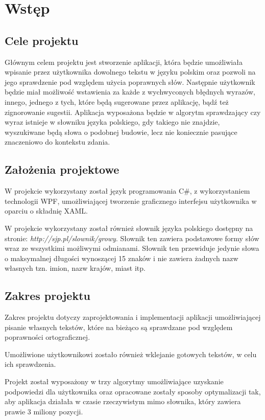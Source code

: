 \chapter{Wstęp}

\section{Cele projektu}

Głównym celem projektu jest stworzenie aplikacji, która będzie umożliwiała wpisanie przez użytkownika dowolnego tekstu w języku polskim oraz pozwoli na jego sprawdzenie pod względem użycia poprawnych słów. Następnie użytkownik będzie miał możliwość wstawienia za każde z wychwyconych błędnych wyrazów, innego, jednego z tych, które będą sugerowane przez aplikację, bądź też zignorowanie sugestii. Aplikacja wyposażona będzie w algorytm sprawdzający czy wyraz istnieje w słowniku języka polskiego, gdy takiego nie znajdzie, wyszukiwane będą słowa o podobnej budowie, lecz nie koniecznie pasujące znaczeniowo do kontekstu zdania.

\section{Założenia projektowe}

W projekcie wykorzystany został język programowania C\#, z wykorzystaniem technologii WPF, umożliwiającej tworzenie graficznego interfejsu użytkownika w oparciu o składnię XAML.

W projekcie wykorzystany został również słownik języka polskiego dostępny na stronie: \textit{http://sjp.pl/slownik/growy}. Słownik ten zawiera podstawowe formy słów wraz ze wszystkimi możliwymi odmianami. Słownik ten przewiduje jedynie słowa o maksymalnej długości wynoszącej 15 znaków i nie zawiera żadnych nazw własnych tzn. imion, nazw krajów, miast itp.

\section{Zakres projektu}
Zakres projektu dotyczy zaprojektowania i implementacji aplikacji umożliwiającej pisanie własnych tekstów, które na bieżąco są sprawdzane pod względem poprawności ortograficznej.

Umożliwione użytkownikowi zostało również wklejanie gotowych tekstów, w celu ich sprawdzenia.

Projekt został wyposażony w trzy algorytmy umożliwiające uzyskanie podpowiedzi dla użytkownika oraz opracowane zostały sposoby optymalizacji tak, aby aplikacja działała w czasie rzeczywistym mimo słownika, który zawiera prawie 3 miliony pozycji.

